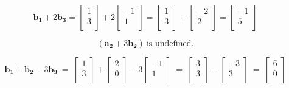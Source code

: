 \documentclass{article}
\begin{document}
\[
    \mathbf{b_1} 
    +
    2 \mathbf{b_3} 
    =     
    \begin{bmatrix}
        1 \\ 3 \\
    \end{bmatrix}
    +
    2
    \begin{bmatrix}
        -1 \\ 1 \\
    \end{bmatrix}
    =
    \begin{bmatrix}
        1 \\ 3 \\
    \end{bmatrix}
    +
    \begin{bmatrix}
        -2 \\ 2 \\
    \end{bmatrix}
    =
    \begin{bmatrix}
        -1 \\ 5 \\
    \end{bmatrix}
\]


\[
    (\mathbf{a_2} +
    3 \mathbf{b_2}  )
    \ \text{is undefined}
.\]


\[
    \mathbf{b_1} +
    \mathbf{b_2} -
    3
    \mathbf{b_3} 
    \ = \
    \begin{bmatrix}
        1 \\ 3 \\
    \end{bmatrix}
    +
    \begin{bmatrix}
        2 \\ 0 \\
    \end{bmatrix}
    -
    3
    \begin{bmatrix}
        -1 \\ 1 \\
    \end{bmatrix}
    \ = \
    \begin{bmatrix}
        3 \\ 3 \\
    \end{bmatrix}
    -
    \begin{bmatrix}
        -3 \\ 3 \\
    \end{bmatrix}
    \ = \
    \begin{bmatrix}
        6 \\ 0 \\
    \end{bmatrix}
\]
\end{document}
